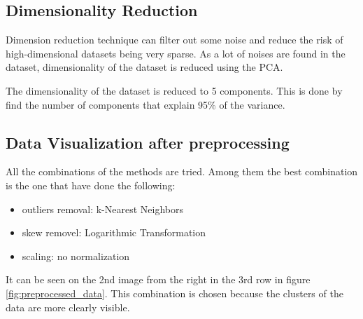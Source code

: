 \documentclass{article}
\begin{document}
        \hfill

        \begingroup
            \subsection{Dimensionality Reduction}
            
            Dimension reduction technique can filter out some noise and reduce the risk of high-dimensional datasets being very sparse.
            As a lot of noises are found in the dataset, dimensionality of the dataset is reduced using the PCA.

            The dimensionality of the dataset is reduced to 5 components.
            This is done by find the number of components that explain 95\% of the variance.

        \endgroup

        \hfill

        \begingroup
            \subsection{Data Visualization after preprocessing}

            All  the combinations of the methods are tried.
            Among them the best combination is the one that have done the following:
            \begin{itemize}
                \item outliers removal: k-Nearest Neighbors
                \item skew removel: Logarithmic Transformation
                \item scaling: no normalization
            \end{itemize}
            It can be seen on the 2nd image from the right in the 3rd row in figure \ref{fig:preprocessed_data}.
            This combination is chosen because the clusters of the data are more clearly visible.
\end{document}
